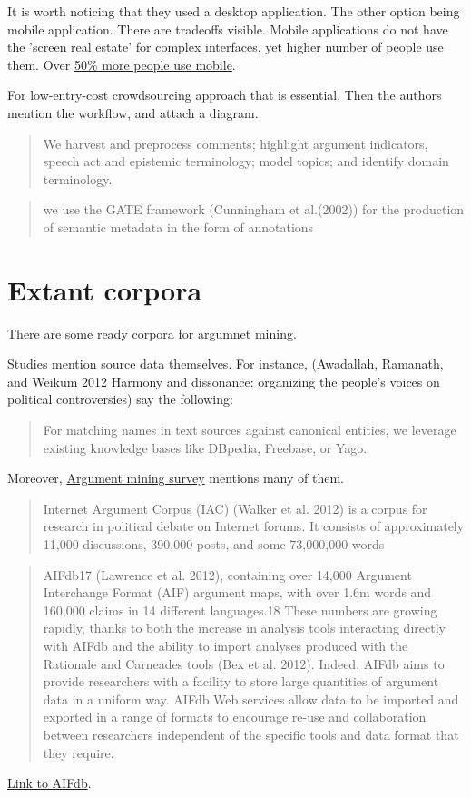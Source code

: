 \documentclass{article}
\begin{document}
It is worth noticing that they used a desktop application. The other option being mobile application. There are tradeoffs visible.
Mobile applications do not have the 'screen real estate' for complex interfaces, yet higher number of people use them. Over \href{https://gs.statcounter.com/platform-market-share/desktop-mobile-tablet}{50\% more people use mobile}.

For low-entry-cost crowdsourcing approach that is essential.
Then the authors mention the workflow, and attach a diagram.
\begin{quote}
 We harvest and preprocess comments; highlight argument indicators, speech act and epistemic terminology; model topics; and identify domain terminology.
\end{quote}
\begin{quote}
 we use the GATE framework (Cunningham et al.(2002)) for the production of semantic metadata in the form of annotations
\end{quote}

\section{Extant corpora}
There are some ready corpora for argumnet mining.

Studies mention source data themselves. 
For instance, (Awadallah, Ramanath, and Weikum 2012 Harmony and dissonance: organizing the people's voices on political controversies)
say the following:
\begin{quote}
 For matching names in text sources against canonical entities, we leverage existing knowledge bases like DBpedia, Freebase, or Yago.
\end{quote}

Moreover, \href{https://direct.mit.edu/coli/article/45/4/765/93362/Argument-Mining-A-Survey}{Argument mining survey} mentions many of them.
\begin{quote}
 Internet Argument Corpus (IAC) (Walker et al. 2012) is a corpus for research in political debate on Internet forums. It consists of approximately 11,000 discussions, 390,000 posts, and some 73,000,000 words
\end{quote}
\begin{quote}
 AIFdb17 (Lawrence et al. 2012), containing over 14,000 Argument Interchange Format (AIF) argument maps, with over 1.6m words and 160,000 claims in 14 different languages.18 These numbers are growing rapidly, thanks to both the increase in analysis tools interacting directly with AIFdb and the ability to import analyses produced with the Rationale and Carneades tools (Bex et al. 2012). Indeed, AIFdb aims to provide researchers with a facility to store large quantities of argument data in a uniform way. AIFdb Web services allow data to be imported and exported in a range of formats to encourage re-use and collaboration between researchers independent of the specific tools and data format that they require.
\end{quote}
\href{https://corpora.aifdb.org/}{Link to AIFdb}.
\end{document}
